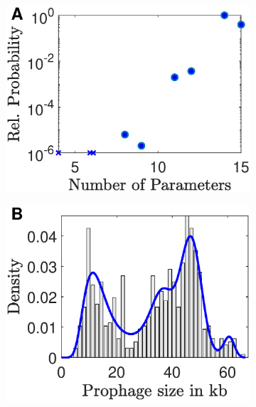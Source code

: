 \begin{figure}[H]
\begin{subfigure}[t]{0.3\textwidth}
\centering
\includegraphics[scale=0.4]{bob_rel.eps}
\end{subfigure}\hfill
\begin{subfigure}[t]{0.3\textwidth}
\includegraphics[scale=0.4]{bob_best_pdf.eps}
\end{subfigure}\hfill
\begin{subfigure}[t]{0.3\textwidth}

\end{subfigure}
\end{figure}
